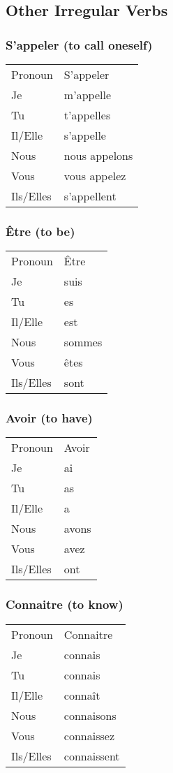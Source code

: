 \subsection{Other Irregular Verbs}

\subsubsection{S'appeler (to call oneself)}
\begin{tabular}{| l | l |}
\hline
Pronoun 	& 	S'appeler	\\
Je		&	m'appelle	\\
Tu		&	t'appelles	\\
Il/Elle		&	s'appelle	\\
Nous		&	nous appelons	\\
Vous		&	vous appelez	\\
Ils/Elles	&	s'appellent	\\
\hline
\end{tabular}

\subsubsection{\^Etre (to be)}
\begin{tabular}{| l | l |}
\hline
Pronoun 	& 	\^Etre	\\
Je		&	suis	\\
Tu		&	es	\\
Il/Elle		&	est	\\
Nous		&	sommes	\\
Vous		&	\^etes	\\
Ils/Elles	&	sont	\\
\hline
\end{tabular}

\subsubsection{Avoir (to have)}
\begin{tabular}{| l | l |}
\hline
Pronoun 	& 	Avoir	\\
Je		&	ai	\\
Tu		&	as	\\
Il/Elle		&	a	\\
Nous		&	avons	\\
Vous		&	avez	\\
Ils/Elles	&	ont	\\
\hline
\end{tabular}

\subsubsection{Connaitre (to know)}
\begin{tabular}{| l | l |}
\hline
Pronoun 	& 	Connaitre	\\
Je		&	connais		\\
Tu		&	connais		\\
Il/Elle		&	conna\^it	\\
Nous		&	connaisons	\\
Vous		&	connaissez	\\
Ils/Elles	&	connaissent	\\
\hline
\end{tabular}


